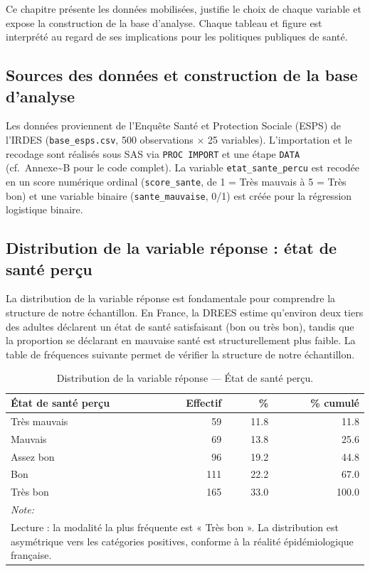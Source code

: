\documentclass[11pt,a4paper]{memoirerecherche}
\begin{document}
Ce chapitre présente les données mobilisées, justifie le choix de chaque variable et expose la construction de la base d'analyse. Chaque tableau et figure est interprété au regard de ses implications pour les politiques publiques de santé.

\hypertarget{sources-des-donnuxe9es-et-construction-de-la-base-danalyse}{%
\subsection{Sources des données et construction de la base d'analyse}\label{sources-des-donnuxe9es-et-construction-de-la-base-danalyse}}

Les données proviennent de l'Enquête Santé et Protection Sociale (ESPS) de l'IRDES (\texttt{base\_esps.csv}, 500 observations \(\times\) 25 variables). L'importation et le recodage sont réalisés sous SAS via \texttt{PROC\ IMPORT} et une étape \texttt{DATA} (cf.~Annexe\textasciitilde B pour le code complet). La variable \texttt{etat\_sante\_percu} est recodée en un score numérique ordinal (\texttt{score\_sante}, de 1 = Très mauvais à 5 = Très bon) et une variable binaire (\texttt{sante\_mauvaise}, 0/1) est créée pour la régression logistique binaire.

\hypertarget{distribution-de-la-variable-ruxe9ponse-uxe9tat-de-santuxe9-peruxe7u}{%
\subsection{Distribution de la variable réponse : état de santé perçu}\label{distribution-de-la-variable-ruxe9ponse-uxe9tat-de-santuxe9-peruxe7u}}

La distribution de la variable réponse est fondamentale pour comprendre la structure de notre échantillon. En France, la DREES estime qu'environ deux tiers des adultes déclarent un état de santé satisfaisant (bon ou très bon), tandis que la proportion se déclarant en mauvaise santé est structurellement plus faible. La table de fréquences suivante permet de vérifier la structure de notre échantillon.

\begin{table}[!h]
\centering
\caption{\label{tab:tab-distrib-esp}Distribution de la variable réponse — État de santé perçu.}
\centering
\fontsize{9}{11}\selectfont
\begin{tabular}[t]{lrrr}
\toprule
État de santé perçu & Effectif & \% & \% cumulé\\
\midrule
Très mauvais & 59 & 11.8 & 11.8\\
Mauvais & 69 & 13.8 & 25.6\\
Assez bon & 96 & 19.2 & 44.8\\
Bon & 111 & 22.2 & 67.0\\
Très bon & 165 & 33.0 & 100.0\\
\bottomrule
\multicolumn{4}{l}{\rule{0pt}{1em}\textit{Note: }}\\
\multicolumn{4}{l}{\rule{0pt}{1em}Lecture : la modalité la plus fréquente est « Très bon ». La distribution est asymétrique vers les catégories positives, conforme à la réalité épidémiologique française.}\\
\end{tabular}
\end{table}
\end{document}
